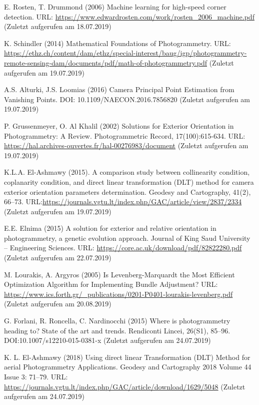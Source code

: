 \documentclass[12pt,oneside]{scrreprt}
\begin{document}
\begin{thebibliography}{10}
 E. Rosten, T. Drummond (2006) Machine learning for high-speed corner detection. URL: \url{https://www.edwardrosten.com/work/rosten_2006_machine.pdf} (Zuletzt aufgerufen am 18.07.2019)

 K. Schindler (2014) Mathematical Foundations of
Photogrammetry. URL: \url{https://ethz.ch/content/dam/ethz/special-interest/baug/igp/photogrammetry-remote-sensing-dam/documents/pdf/math-of-photogrammetry.pdf} (Zuletzt aufgerufen am 19.07.2019)

 A.S. Alturki, J.S. Loomias (2016) Camera Principal Point Estimation from Vanishing Points. DOI: 10.1109/NAECON.2016.7856820 (Zuletzt aufgerufen am 19.07.2019)

 P. Grussenmeyer, O. Al Khalil (2002) Solutions for Exterior Orientation in Photogrammetry: A Review. Photogrammetric Record, 17(100):615-634. URL: \url{https://hal.archives-ouvertes.fr/hal-00276983/document} (Zuletzt aufgerufen am 19.07.2019)

 K.L.A. El-Ashmawy (2015). A comparison study between collinearity condition, coplanarity condition, and direct linear transformation (DLT) method for camera exterior orientation parameters determination. Geodesy and Cartography, 41(2), 66–73. URL:\url{https://journals.vgtu.lt/index.php/GAC/article/view/2837/2334} (Zuletzt aufgerufen am 19.07.2019)

 E.E. Elnima (2015) A solution for exterior and relative orientation
in photogrammetry, a genetic evolution approach. Journal of King Saud University – Engineering Sciences. URL: \url{https://core.ac.uk/download/pdf/82822280.pdf}  (Zuletzt aufgerufen am 22.07.2019)

 M. Lourakis, A. Argyros (2005) Is Levenberg-Marquardt the Most Efficient Optimization Algorithm for Implementing Bundle Adjustment? URL: \url{https://www.ics.forth.gr/_publications/0201-P0401-lourakis-levenberg.pdf} (Zuletzt aufgerufen am 20.08.2019) 

 G. Forlani, R. Roncella, C. Nardinocchi (2015) Where is photogrammetry heading to? State of the art and trends. Rendiconti Lincei, 26(S1), 85–96. DOI:10.1007/s12210-015-0381-x  (Zuletzt aufgerufen am 24.07.2019)

 K. L. El-Ashmawy (2018) Using direct linear Transformation (DLT) Method for
aerial Photogrammetry Applications. Geodesy and Cartography 2018 Volume 44 Issue 3: 71–79. URL: \url{https://journals.vgtu.lt/index.php/GAC/article/download/1629/5048} (Zuletzt aufgerufen am 24.07.2019)


\end{thebibliography}
\end{document}
